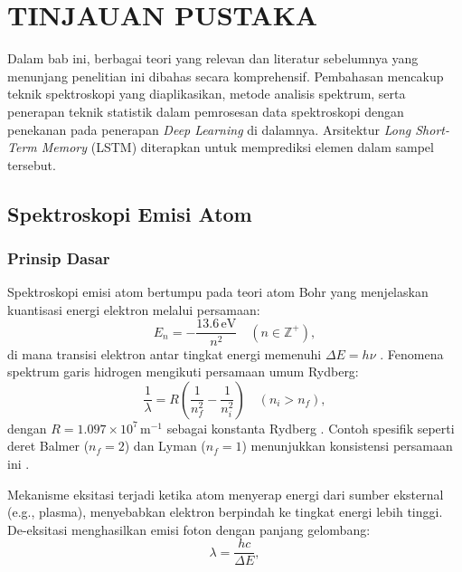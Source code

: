 


\chapter{TINJAUAN PUSTAKA}
\par Dalam bab ini, berbagai teori yang relevan dan literatur sebelumnya yang menunjang penelitian ini dibahas secara komprehensif. Pembahasan mencakup teknik spektroskopi yang diaplikasikan, metode analisis spektrum, serta penerapan teknik statistik dalam pemrosesan data spektroskopi dengan penekanan pada penerapan \textit{Deep Learning} di dalamnya. Arsitektur \textit{Long Short-Term Memory} (LSTM) diterapkan untuk memprediksi elemen dalam sampel tersebut.

\section{Spektroskopi Emisi Atom}
\subsection{Prinsip Dasar}
\label{subsec:prinsip-dasar}

Spektroskopi emisi atom bertumpu pada teori atom Bohr yang menjelaskan kuantisasi energi elektron melalui persamaan:
\begin{equation}
\label{eq:energi-bohr}
E_n = -\frac{13.6 \, \text{eV}}{n^2} \quad (n \in \mathbb{Z}^+),
\end{equation}
di mana transisi elektron antar tingkat energi memenuhi $\Delta E = h\nu$ \citep{Beiser1992}. Fenomena spektrum garis hidrogen mengikuti persamaan umum Rydberg:
\begin{equation}
\label{eq:rydberg-umum}
\frac{1}{\lambda} = R \left( \frac{1}{n_f^2} - \frac{1}{n_i^2} \right) \quad (n_i > n_f),
\end{equation}
dengan $R = 1.097 \times 10^7 \, \text{m}^{-1}$ sebagai konstanta Rydberg \citep{Beiser1992}. Contoh spesifik seperti deret Balmer ($n_f = 2$) dan Lyman ($n_f = 1$) menunjukkan konsistensi persamaan ini \citep{Griffiths2005}.

Mekanisme eksitasi terjadi ketika atom menyerap energi dari sumber eksternal (e.g., plasma), menyebabkan elektron berpindah ke tingkat energi lebih tinggi. De-eksitasi menghasilkan emisi foton dengan panjang gelombang:
\begin{equation}
\label{eq:panjang-gelombang}
\lambda = \frac{hc}{\Delta E},
\end{equation}

